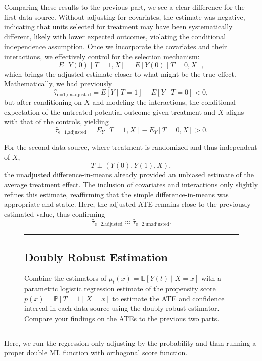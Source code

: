 \documentclass{article}
\newenvironment{colorparagraph}[1]{\par\color{#1}}{\par}
\begin{document}
Comparing these results to the previous part, we see a clear difference for the first data source. Without adjusting for covariates, the estimate was negative, indicating that units selected for treatment may have been systematically different, likely with lower expected outcomes, violating the conditional independence assumption. Once we incorporate the covariates and their interactions, we effectively control for the selection mechanism:
\[
E[Y(0) \mid T=1,X] = E[Y(0) \mid T=0,X],
\]
which brings the adjusted estimate closer to what might be the true effect. Mathematically, we had previously
\[
\widehat{\tau}_{\text{e=1,unadjusted}} = E[Y \mid T=1] - E[Y \mid T=0] < 0,
\]
but after conditioning on \( X \) and modeling the interactions, the conditional expectation of the untreated potential outcome given treatment and \( X \) aligns with that of the controls, yielding
\[
\widehat{\tau}_{\text{e=1,adjusted}} = E_Y[T=1,X]-E_Y[T=0,X] > 0.
\]

For the second data source, where treatment is randomized and thus independent of \( X \),
\[
T \perp (Y(0), Y(1), X),
\]
the unadjusted difference-in-means already provided an unbiased estimate of the average treatment effect. The inclusion of covariates and interactions only slightly refines this estimate, reaffirming that the simple difference-in-means was appropriate and stable. Here, the adjusted ATE remains close to the previously estimated value, thus confirming
\[
\widehat{\tau}_{\text{e=2,adjusted}} \approx \widehat{\tau}_{\text{e=2,unadjusted}}.
\]

\begin{figure}[H]
  \begin{colorparagraph}{questioncolor}
  \rule{\textwidth}{0.5pt}
  \label{q3c}
  \subsection{Doubly Robust Estimation}

  Combine the estimators of \( \mu_t(x) = \mathbb{E}[Y(t) \mid X = x] \) with a parametric logistic regression estimate of the propensity score \( p(x) = \mathbb{P}[T = 1 \mid X = x] \) to estimate the ATE and confidence interval in each data source using the doubly robust estimator. Compare your findings on the ATEs to the previous two parts.

  \rule{\textwidth}{0.5pt}
  \end{colorparagraph}
\end{figure}

Here, we run the regression only adjusting by the probability and than running a proper double ML function with orthogonal score function.
\end{document}
